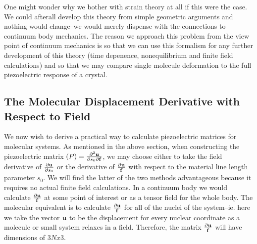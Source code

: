 One might wonder why we bother with strain theory at all if this were the case.  
We could afterall develop this theory from simple geometric arguments and nothing would change--we would merely dispense
with the connections to continuum body mechanics.  
The reason we approach this problem from the view point of continuum mechanics is so that we can use this formalism for any further development 
of this theory (time depenence, nonequilibrium and finite field calculations) and so that we may compare single molecule deformation to the full 
piezoelectric response of a crystal.  


\subsection{The Molecular Displacement Derivative with Respect to Field}
We now wish to derive a practical way to calculate piezoelectric matrices for molecular systems.
As mentioned in the above section, when constructing the piezoelectric matrix ${\mathbf (}P)=\frac{\partial^2{\mathbf u}}{\partial s_0 \partial {\mathbf f}}$,
we may choose either to take the field derivative of $\frac{\partial {\mathbf u}}{\partial s_0}$ or the derivative of 
$\frac{\partial {\mathbf u}}{{\mathbf f}}$ with respect to the material line length parameter $s_0$.  
We will find the latter of the two methods advantageous because it requires no actual finite field calculations.
In a continuum body we would calculate $\frac{\partial {\mathbf u}}{{\mathbf f}}$ at some point of interest or as a tensor field for the whole body.
The molecular equivalent is to calculate $\frac{\partial {\mathbf u}}{{\mathbf f}}$ for all of the nuclei of the system--ie. here we take the vector
${\bf{u}}$ to be the displacement for every nuclear coordinate as a molecule or small system relaxes in a field.
Therefore, the matrix $\frac{\partial {\mathbf u}}{{\mathbf f}}$ will have dimensions of $3Nx3$.


